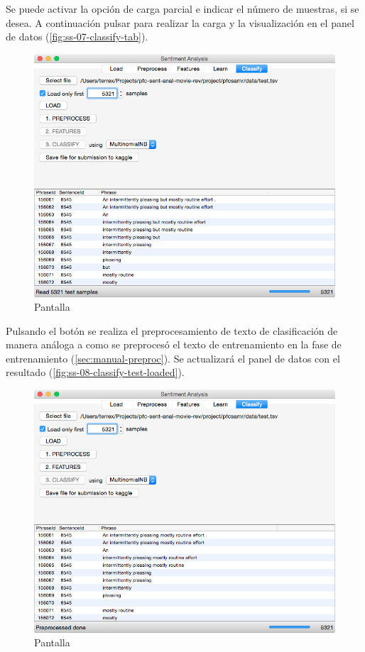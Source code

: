 Se puede activar la opción de carga parcial e indicar el número de muestras, si se desea. A continuación pulsar  para realizar la carga y la visualización en el panel de datos (\autoref{fig:ss-07-classify-tab}).

\begin{figure}[H]
\centering
\includegraphics[width=12cm]{ss-08-classify-test-loaded}
\caption{Pantalla }
\label{fig:ss-08-classify-test-loaded}
\end{figure}

Pulsando el botón  se realiza el preprocesamiento de texto de clasificación de manera análoga a como se preprocesó el texto de entrenamiento en la fase de entrenamiento (\autoref{sec:manual-preproc}). Se actualizará el panel de datos con el resultado (\autoref{fig:ss-08-classify-test-loaded}).

\begin{figure}[H]
\centering
\includegraphics[width=12cm]{ss-09-classify-test-preproccesed}
\caption{Pantalla }
\label{fig:ss-09-classify-test-preproccesed}
\end{figure}

